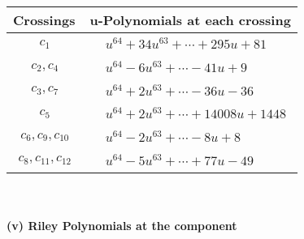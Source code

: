 \documentclass[1p]{elsarticle_modified}
\theoremstyle{definition}
\begin{document}
\begin{tabular}{m{50pt}|m{274pt}}
Crossings & \hspace{64pt}u-Polynomials at each crossing \\
\hline $$\begin{aligned}c_{1}\end{aligned}$$&$\begin{aligned}
&u^{64}+34 u^{63}+\cdots+295 u+81
\end{aligned}$\\
\hline $$\begin{aligned}c_{2},c_{4}\end{aligned}$$&$\begin{aligned}
&u^{64}-6 u^{63}+\cdots-41 u+9
\end{aligned}$\\
\hline $$\begin{aligned}c_{3},c_{7}\end{aligned}$$&$\begin{aligned}
&u^{64}+2 u^{63}+\cdots-36 u-36
\end{aligned}$\\
\hline $$\begin{aligned}c_{5}\end{aligned}$$&$\begin{aligned}
&u^{64}+2 u^{63}+\cdots+14008 u+1448
\end{aligned}$\\
\hline $$\begin{aligned}c_{6},c_{9},c_{10}\end{aligned}$$&$\begin{aligned}
&u^{64}-2 u^{63}+\cdots-8 u+8
\end{aligned}$\\
\hline $$\begin{aligned}c_{8},c_{11},c_{12}\end{aligned}$$&$\begin{aligned}
&u^{64}-5 u^{63}+\cdots+77 u-49
\end{aligned}$\\
\hline
\end{tabular}\\~\\
\newpage\renewcommand{\arraystretch}{1}
\flushleft \textbf{(v) Riley Polynomials at the component}\newline \\
\end{document}
